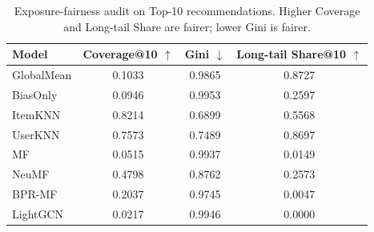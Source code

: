 \begin{table}[t]
\centering
\caption{Exposure-fairness audit on Top-10 recommendations. Higher Coverage and Long-tail Share are fairer; lower Gini is fairer.}
\label{tab:fairness}
\small
\begin{tabular}{lccc}
\toprule
Model & Coverage@10 $\uparrow$ & Gini $\downarrow$ & Long-tail Share@10 $\uparrow$ \\
\midrule
GlobalMean & 0.1033 & 0.9865 & 0.8727 \\
BiasOnly & 0.0946 & 0.9953 & 0.2597 \\
ItemKNN & 0.8214 & 0.6899 & 0.5568 \\
UserKNN & 0.7573 & 0.7489 & 0.8697 \\
MF & 0.0515 & 0.9937 & 0.0149 \\
NeuMF & 0.4798 & 0.8762 & 0.2573 \\
BPR-MF & 0.2037 & 0.9745 & 0.0047 \\
LightGCN & 0.0217 & 0.9946 & 0.0000 \\
\bottomrule
\end{tabular}
\end{table}